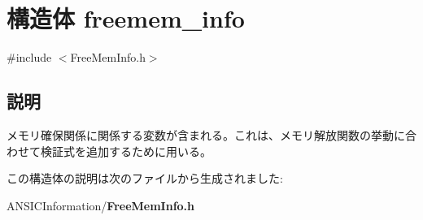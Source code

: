 \section{構造体 freemem\_\-info}
\label{structfreemem__info}


{\ttfamily \#include $<$FreeMemInfo.h$>$}



\subsection{説明}
メモリ確保関係に関係する変数が含まれる。これは、メモリ解放関数の挙動に合わせて検証式を追加するために用いる。 

この構造体の説明は次のファイルから生成されました:\begin{DoxyCompactItemize}
\item 
ANSICInformation/{\bf FreeMemInfo.h}\end{DoxyCompactItemize}
